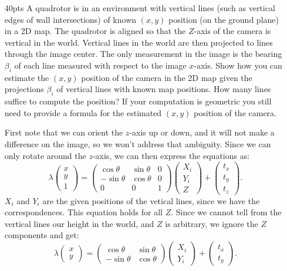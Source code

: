 \documentclass[11pt,english]{article}
\begin{document}
\begin{enumerate}
\item[40pts]
A quadrotor is in an environment with vertical lines (such as vertical edges of wall intersections) of known $(x,y)$ position (on the ground plane) in a 2D map.  The quadrotor is aligned so that the $Z$-axis of the camera is vertical in the world. Vertical lines in the world are then projected to lines through the image center. The only measurement in the image is the bearing $\beta_i$ of each line measured with respect to the image $x$-axis. Show how you can estimate the $(x,y)$ position of the camera in the 2D map given the projections $\beta_i$ of vertical lines with known map positions. How many lines suffice to compute the position? If your computation is geometric you still need to provide a formula for the estimated $(x,y)$ position of the camera. 

First note that we can orient the $z$-axis up or down, and it will not make a difference on the image, so we won't 
address that ambiguity. Since we can only rotate around the $z$-axis, we can then express the equations as:
\begin{equation*}
 \lambda \begin{pmatrix} x \\ y \\ 1 \end{pmatrix} = 
\begin{pmatrix} \cos\theta & \sin\theta & 0
\\ -\sin\theta & \cos\theta & 0
\\ 0 & 0 & 1 
\end{pmatrix} \begin{pmatrix} X_i \\ Y_i \\ Z \end{pmatrix} + \begin{pmatrix} t_x \\ t_y \\ t_z \end{pmatrix}.
\end{equation*}
$X_i$ and $Y_i$ are the given positions of the vetical lines, since we have the correspondences.
This equation holds for all $Z$.  Since we cannot tell from the vertical lines our height in the world, and $Z$ is
arbitrary, we ignore the $Z$ components and get:
\begin{equation*}
 \lambda \begin{pmatrix} x \\ y \end{pmatrix} = 
\begin{pmatrix} \cos\theta & \sin\theta 
\\ -\sin\theta & \cos\theta 
\end{pmatrix} \begin{pmatrix} X_i \\ Y_i \end{pmatrix} + \begin{pmatrix} t_x \\ t_y \end{pmatrix}.
\end{equation*}


\end{enumerate}
\end{document}
